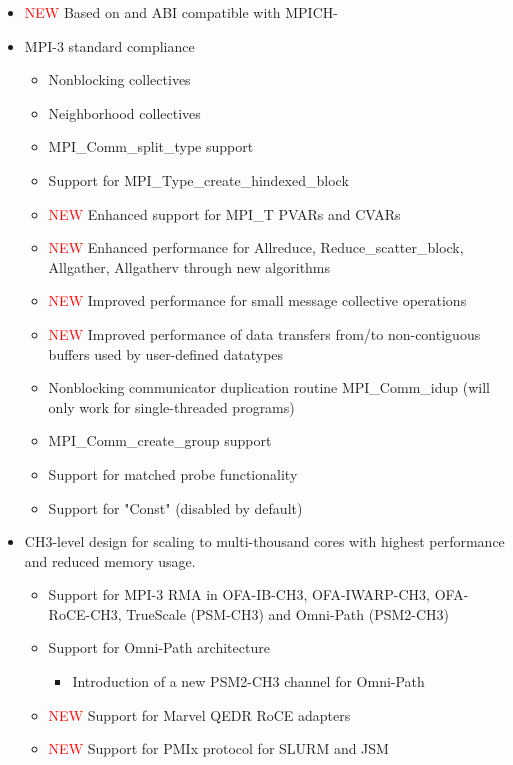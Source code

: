 \begin{itemize}
    \item \textcolor{red}{NEW} Based on and ABI compatible with MPICH-\mpichversion
  \item MPI-3 standard compliance
    \begin{itemize}
    \item Nonblocking collectives
    \item Neighborhood collectives
    \item MPI\_Comm\_split\_type support
    \item Support for MPI\_Type\_create\_hindexed\_block
    \item \textcolor{red}{NEW} Enhanced support for MPI\_T PVARs and CVARs
    \item \textcolor{red}{NEW} Enhanced performance for Allreduce, Reduce\_scatter\_block, Allgather, Allgatherv through new algorithms
    \item \textcolor{red}{NEW} Improved performance for small message collective operations
    \item \textcolor{red}{NEW} Improved performance of data transfers from/to non-contiguous buffers used by user-defined datatypes
    \item Nonblocking communicator duplication routine MPI\_Comm\_idup (will only work for single-threaded programs)
    \item MPI\_Comm\_create\_group support
    \item Support for matched probe functionality
    \item Support for "Const" (disabled by default)
    \end{itemize}
  \item  CH3-level design for scaling to multi-thousand cores with highest
  performance and reduced memory usage.
    \begin{itemize}
      \item    Support for MPI-3 RMA in OFA-IB-CH3, OFA-IWARP-CH3, OFA-RoCE-CH3, TrueScale (PSM-CH3) and Omni-Path (PSM2-CH3)
      \item  Support for Omni-Path architecture
      \begin{itemize}
        \item  Introduction of a new PSM2-CH3 channel for Omni-Path
      \end{itemize}
      \item  \textcolor{red}{NEW} Support for Marvel QEDR RoCE adapters
      \item  \textcolor{red}{NEW} Support for PMIx protocol for SLURM and JSM

\end{itemize}
\end{itemize}
